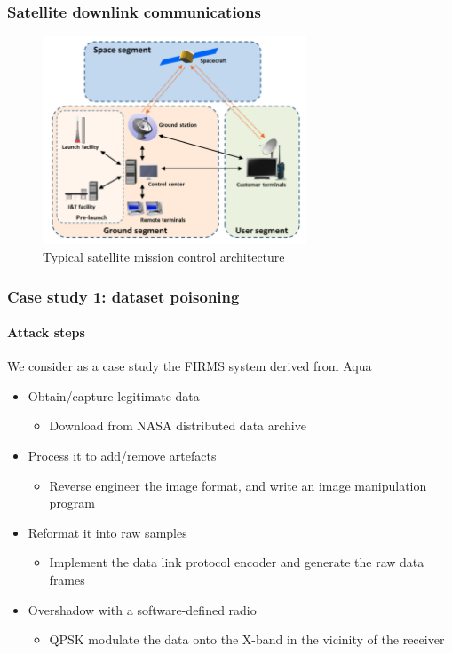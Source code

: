 \documentclass{beamer}
\begin{document}
\begin{frame}
  \frametitle{Satellite downlink communications}
  \begin{figure}
  \centering
      \includegraphics[width=0.7\textwidth]{images/space_segment.png}
      \caption{Typical satellite mission control architecture}
      \label{fig:space_segment}
  \end{figure}
\end{frame}

\begin{frame}
  \frametitle{Case study 1: dataset poisoning}
  \framesubtitle{Attack steps}
  We consider as a case study the FIRMS system derived from Aqua
  
  \begin{itemize}[<+->]
    \item Obtain/capture legitimate data
    \begin{itemize}
      \item Download from NASA distributed data archive
    \end{itemize}

    \item Process it to add/remove artefacts
    \begin{itemize}
      \item Reverse engineer the image format, and write an image manipulation program
    \end{itemize}

    \item Reformat it into raw samples
    \begin{itemize}
      \item Implement the data link protocol encoder and generate the raw data frames
    \end{itemize}

    \item Overshadow with a software-defined radio
    \begin{itemize}
      \item QPSK modulate the data onto the X-band in the vicinity of the receiver
    \end{itemize}
  \end{itemize}
\end{frame}
\end{document}
